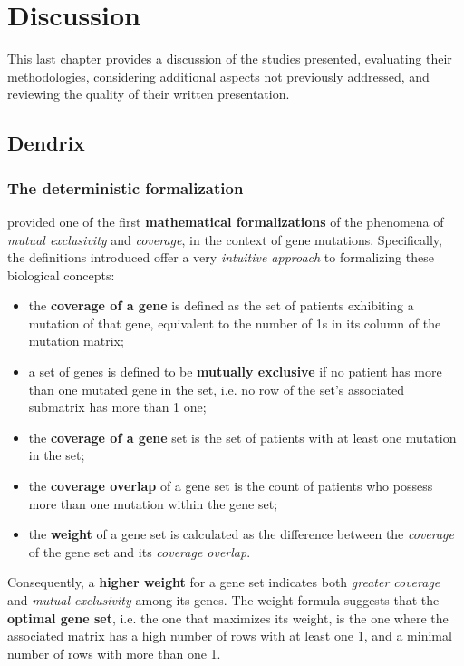 \chapter{Discussion} \label{chap:discussion}

This last chapter provides a discussion of the studies presented, evaluating their methodologies, considering additional aspects not previously addressed, and reviewing the quality of their written presentation.

\section{Dendrix}

\subsection{The deterministic formalization}

\textcite{dendrix} provided one of the first \textbf{mathematical formalizations} of the phenomena of \textit{mutual exclusivity} and \textit{coverage}, in the context of gene mutations. Specifically, the definitions introduced offer a very \textit{intuitive approach} to formalizing these biological concepts:

\begin{itemize}
    \item the \textbf{coverage of a gene} is defined as the set of patients exhibiting a mutation of that gene, equivalent to the number of 1s in its column of the mutation matrix;
    \item a set of genes is defined to be \textbf{mutually exclusive} if no patient has more than one mutated gene in the set, i.e. no row of the set's associated submatrix has more than 1 one;
    \item the \textbf{coverage of a gene} set is the set of patients with at least one mutation in the set;
    \item the \textbf{coverage overlap} of a gene set is the count of patients who possess more than one mutation within the gene set;
    \item the \textbf{weight} of a gene set is calculated as the difference between the \textit{coverage} of the gene set and its \textit{coverage overlap}.
\end{itemize}

Consequently, a \textbf{higher weight} for a gene set indicates both \textit{greater coverage} and \textit{mutual exclusivity} among its genes. The weight formula suggests that the \textbf{optimal gene set}, i.e. the one that maximizes its weight, is the one where the associated matrix has a high number of rows with at least one 1, and a minimal number of rows with more than one 1.

